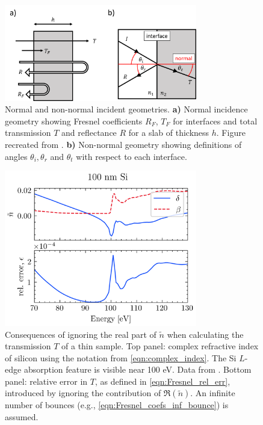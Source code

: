 \begin{figure}
	\centering
	\includegraphics[width=0.75\textwidth]{figures/chap3/Fresnel_Geometry.png}
	\caption{Normal and non-normal incident geometries. \textbf{a)} Normal incidence geometry showing Fresnel coefficients $R_F$, $T_F$ for interfaces and total transmission $T$ and reflectance $R$ for a slab of thickness $h$. Figure recreated from \cite{nichelattiComplexRefractiveIndex2002}. \textbf{b)} Non-normal geometry showing definitions of angles $\theta_i, \theta_r$ and $\theta_t$ with respect to each interface.}
	\label{fig:Fresnel_Geometry}
\end{figure}

\begin{figure}
	\centering
	\includegraphics[width=0.75\textwidth]{figures/chap3/Si_transmission_Fresnel.png}
	\caption{Consequences of ignoring the real part of $\tilde{n}$ when calculating the transmission $T$ of a thin sample. Top panel: complex refractive index of silicon using the notation from \cref{eqn:complex_index}. The Si $L$-edge absorption feature is visible near 100 eV. Data from \cite{gulliksonCXROXRayInteractions}. Bottom panel: relative error in $T$, as defined in \cref{eqn:Fresnel_rel_err}, introduced by ignoring the contribution of $\Re(\tilde{n})$. An infinite number of bounces (e.g., \cref{eqn:Fresnel_coefs_inf_bounce}) is assumed.}
	\label{fig:Si_transmission_Fresnel}
\end{figure}


